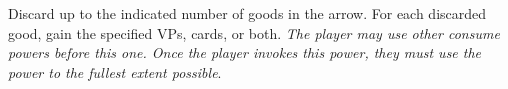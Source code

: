 \documentclass[letterpaper,landscape,twocolumn,8pt]{extarticle}
\begin{document}
\begin{minipage}[t]{\calc{1/3}\columnwidth}



Discard up to the indicated number of goods in the arrow. For each discarded
good, gain the specified VPs, cards, or both.
\smallbreak{}
\textit{The player may use other consume powers before this one. Once the player
invokes this power, they must use the power to the fullest extent possible}.

\end{minipage}
\end{document}
